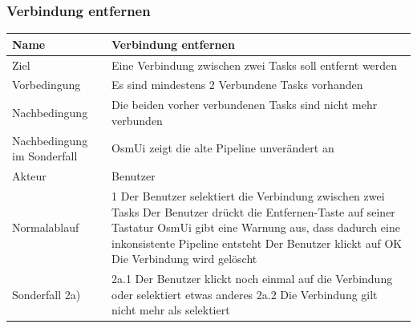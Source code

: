 \documentclass[a4paper,12pt]{scrartcl}
\begin{document}
\subsubsection{Verbindung entfernen}
\begin{center}
\begin{tabular}{|p{5cm}|p{10cm}|}
\hline Name & \textbf{Verbindung entfernen} \\ 
\hline Ziel & Eine Verbindung zwischen zwei Tasks soll entfernt werden \\ 
\hline Vorbedingung & Es sind mindestens 2 Verbundene Tasks vorhanden \\ 
\hline Nachbedingung &  Die beiden vorher verbundenen Tasks sind nicht mehr verbunden\\ 
\hline Nachbedingung im Sonderfall & OsmUi zeigt die alte Pipeline unverändert an \\ 
\hline Akteur & Benutzer \\ 
\hline Normalablauf & 1 Der Benutzer selektiert die Verbindung zwischen zwei Tasks
\newline 2 Der Benutzer drückt die Entfernen-Taste auf seiner Tastatur
\newline 3 OsmUi gibt eine Warnung aus, dass dadurch eine inkonsistente Pipeline entsteht
\newline 4 Der Benutzer klickt auf OK
\newline 5 Die Verbindung wird gelöscht\\ 
\hline Sonderfall 2a) & 2a.1 Der Benutzer klickt noch einmal auf die Verbindung oder selektiert etwas anderes
\newline 2a.2 Die Verbindung gilt nicht mehr als selektiert\\
\hline 
\end{tabular}  
\end{center}
\end{document}
